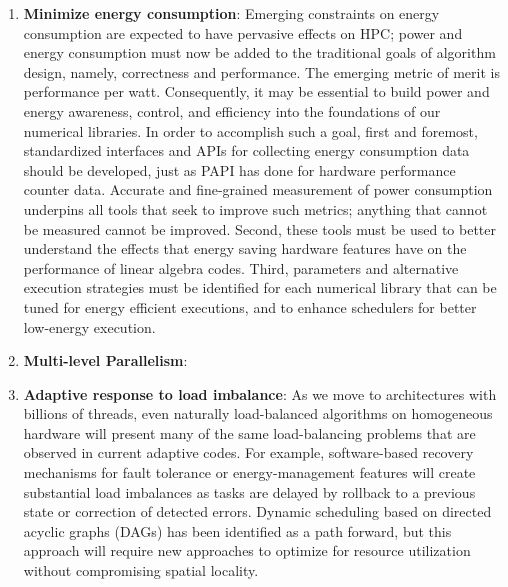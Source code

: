 \begin{enumerate}
	\item \textbf{Minimize energy consumption}: Emerging constraints on energy consumption are expected to have pervasive effects on HPC; power and energy consumption must now be added to the traditional goals of algorithm design, namely, correctness and performance. The emerging metric of merit is performance per watt. Consequently, it may be essential to build power and energy awareness, control, and efficiency into the foundations of our numerical libraries. In order to accomplish such a goal, first and foremost, standardized interfaces and APIs for collecting energy consumption data should be developed, just as PAPI has done for hardware performance counter data. Accurate and fine-grained measurement of power consumption underpins all tools that seek to improve such metrics; anything that cannot be measured cannot be improved. Second, these tools must be used to better understand the effects that energy saving hardware features have on the performance of linear algebra codes. Third, parameters and alternative execution strategies must be identified for each numerical library that can be tuned for energy efficient executions, and to enhance schedulers for better low-energy execution.
	
	\item \textbf{Multi-level Parallelism}: 
	
	\item \textbf{Adaptive response to load imbalance}: As we move to architectures with billions of threads, even naturally load-balanced algorithms on homogeneous hardware will present many of the same load-balancing problems that are observed in current adaptive codes. For example, software-based recovery mechanisms for fault tolerance or energy-management features will create substantial load imbalances as tasks are delayed by rollback to a previous state or correction of detected errors. Dynamic scheduling based on directed acyclic graphs (DAGs) has been identified as a path forward, but this approach will require new approaches to optimize for resource utilization without compromising spatial locality.
	

\end{enumerate}
